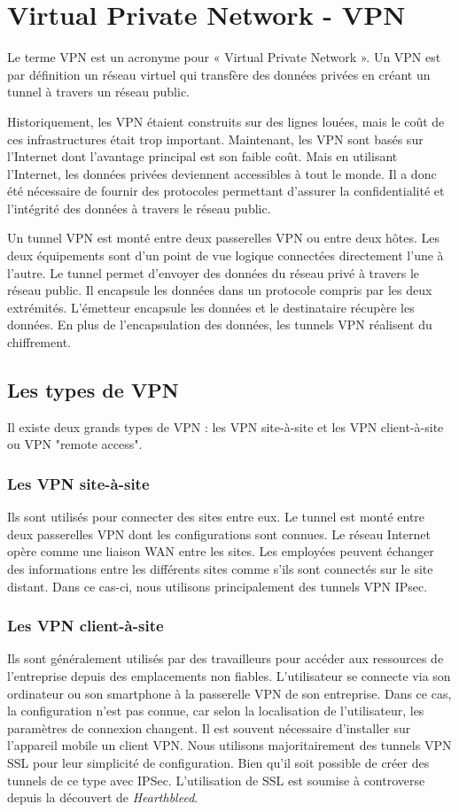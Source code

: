 \section{Virtual Private Network - VPN}
Le terme VPN est un acronyme pour « Virtual Private Network ».
Un VPN est par définition un réseau virtuel qui transfère des données privées en créant un tunnel à travers un réseau public.

Historiquement, les VPN étaient construits sur des lignes louées, mais le coût de ces infrastructures était trop important.
Maintenant, les VPN sont basés sur l'Internet dont l'avantage principal est son faible coût.
Mais en utilisant l'Internet, les données privées deviennent accessibles à tout le monde. 
Il a donc été nécessaire de fournir des protocoles permettant d'assurer la confidentialité et l'intégrité des données à travers le réseau public. 

Un tunnel VPN est monté entre deux passerelles VPN ou entre deux hôtes. 
Les deux équipements sont d'un point de vue logique connectées directement l'une à l'autre. 
Le tunnel permet d'envoyer des données du réseau privé à travers le réseau public.
Il encapsule les données dans un protocole compris par les deux extrémités. 
L'émetteur encapsule les données et le destinataire récupère les données. 
En plus de l'encapsulation des données, les tunnels VPN réalisent du chiffrement. 

\subsection{Les types de VPN}
Il existe deux grands types de VPN : les VPN site-à-site et les VPN client-à-site ou VPN "remote access".

\subsubsection{Les VPN site-à-site} 
Ils sont utilisés pour connecter des sites entre eux. 
Le tunnel est monté entre deux passerelles VPN dont les configurations sont connues. 
Le réseau Internet opère comme une liaison WAN entre les sites. 
Les employées peuvent échanger des informations entre les différents sites comme s'ils sont connectés sur le site distant. 
Dans ce cas-ci, nous utilisons principalement des tunnels VPN IPsec. 

\subsubsection{Les VPN client-à-site} 
Ils sont généralement utilisés par des travailleurs pour accéder aux ressources de l'entreprise depuis des emplacements non fiables.  
L'utilisateur se connecte via son ordinateur ou son smartphone à la passerelle VPN de son entreprise.  
Dans ce cas, la configuration n'est pas connue, car selon la localisation de l'utilisateur, les paramètres de connexion changent.  
Il est souvent nécessaire d'installer sur l'appareil mobile un client VPN. 
Nous utilisons majoritairement des tunnels VPN SSL pour leur simplicité de configuration. 
Bien qu'il soit possible de créer des tunnels de ce type avec IPSec.
L'utilisation de SSL est soumise à controverse depuis la découvert de \textit{Hearthbleed}.

